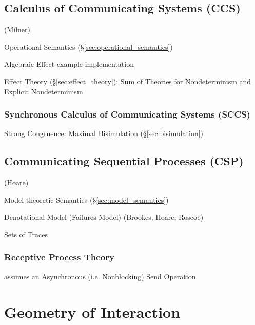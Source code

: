 \subsection{Calculus of Communicating Systems (CCS)}\label{sec:ccs}

(Milner)

Operational Semantics (\S\ref{sec:operational_semantics})

Algebraic Effect example implementation \cite{plotkin-pretnar13}

Effect Theory (\S\ref{sec:effect_theory}): Sum of Theories for
Nondeterminism and Explicit Nondeterminism \cite{plotkin-pretnar13}



\subsubsection{Synchronous Calculus of Communicating Systems (SCCS)}
\label{sec:sccs}

Strong Congruence: Maximal Bisimulation (\S\ref{sec:bisimulation})
\cite{aczel88}



\subsection{Communicating Sequential Processes (CSP)}\label{sec:csp}

(Hoare)

Model-theoretic Semantics (\S\ref{sec:model_semantics})

Denotational Model (Failures Model) (Brookes, Hoare, Roscoe)

Sets of Traces



\subsubsection{Receptive Process Theory}\label{sec:receptive_process}

assumes an Asynchronous (i.e. Nonblocking) Send Operation



\section{Geometry of Interaction}\label{sec:interaction_geometry}

